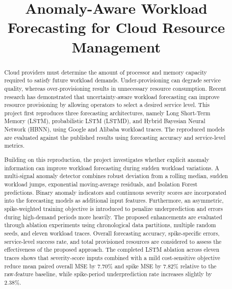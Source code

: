 \documentclass[conference]{IEEEtran}
\begin{document}
\title{Anomaly-Aware Workload Forecasting for Cloud Resource Management}

\author{
}

\maketitle

\begin{abstract}
Cloud providers must determine the amount of processor and memory capacity required to satisfy future workload demands. Under-provisioning can degrade service quality, whereas over-provisioning results in unnecessary resource consumption. Recent research has demonstrated that uncertainty-aware workload forecasting can improve resource provisioning by allowing operators to select a desired service level. This project first reproduces three forecasting architectures, namely Long Short-Term Memory (LSTM), probabilistic LSTM (LSTMD), and Hybrid Bayesian Neural Network (HBNN), using Google and Alibaba workload traces. The reproduced models are evaluated against the published results using forecasting accuracy and service-level metrics.

Building on this reproduction, the project investigates whether explicit anomaly information can improve workload forecasting during sudden workload variations. A multi-signal anomaly detector combines robust deviation from a rolling median, sudden workload jumps, exponential moving-average residuals, and Isolation Forest predictions. Binary anomaly indicators and continuous severity scores are incorporated into the forecasting models as additional input features. Furthermore, an asymmetric, spike-weighted training objective is introduced to penalize underprediction and errors during high-demand periods more heavily. The proposed enhancements are evaluated through ablation experiments using chronological data partitions, multiple random seeds, and eleven workload traces. Overall forecasting accuracy, spike-specific errors, service-level success rate, and total provisioned resources are considered to assess the effectiveness of the proposed approach.
The completed LSTM ablation across eleven traces shows that severity-score inputs combined with a mild cost-sensitive objective reduce mean paired overall MSE by 7.70\% and spike MSE by 7.82\% relative to the raw-feature baseline, while spike-period underprediction rate increases slightly by 2.38\%.
\end{abstract}
\end{document}
